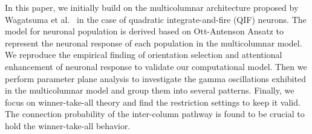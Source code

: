 \documentclass[10pt,letterpaper]{article}
\begin{document}
In this paper, we initially build on the multicolumnar architecture proposed by Wagatsuma et al.~\cite{wagatsuma2011} in the case of quadratic integrate-and-fire (QIF) neurons. The model for neuronal population is derived based on Ott-Antenson Ansatz to represent the neuronal response of each population in the multicolumnar model. We reproduce the empirical finding of orientation selection and attentional enhancement of neuronal response to validate our computational model. Then we perform parameter plane analysis to investigate the gamma oscillations exhibited in the multicolumnar model and group them into several patterns. Finally, we focus on winner-take-all theory and find the restriction settings to keep it valid. The connection probability of the inter-column pathway is found to be crucial to hold the winner-take-all behavior.
\end{document}
